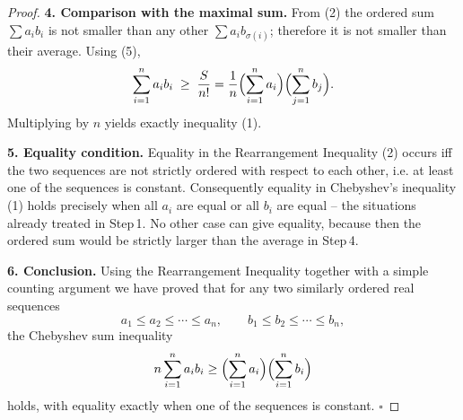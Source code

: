 \begin{proof}
\medskip\noindent\textbf{4. Comparison with the maximal sum.}  
From (2) the ordered sum \(\sum a_{i}b_{i}\) is not smaller than any other
\(\sum a_{i}b_{\sigma(i)}\); therefore it is not smaller than their average.  Using (5),
\[
\sum_{i=1}^{n}a_{i}b_{i}\;\ge\;
\frac{S}{n!}
=
\frac{1}{n}\Bigl(\sum_{i=1}^{n}a_{i}\Bigr)\Bigl(\sum_{j=1}^{n}b_{j}\Bigr).
\]
Multiplying by \(n\) yields exactly inequality (1).

\medskip\noindent\textbf{5. Equality condition.}  
Equality in the Rearrangement Inequality (2) occurs iff the two sequences are
not strictly ordered with respect to each other, i.e. at least one of the
sequences is constant.  Consequently equality in Chebyshev’s inequality (1)
holds precisely when all \(a_{i}\) are equal or all \(b_{i}\) are equal – the
situations already treated in Step 1. No other case can give equality, because
then the ordered sum would be strictly larger than the average in Step 4.

\medskip\noindent\textbf{6. Conclusion.}  
Using the Rearrangement Inequality together with a simple counting argument we
have proved that for any two similarly ordered real sequences
\[
a_{1}\le a_{2}\le\cdots\le a_{n},\qquad
b_{1}\le b_{2}\le\cdots\le b_{n},
\]
the Chebyshev sum inequality
\[
n\sum_{i=1}^{n}a_{i}b_{i}\ge
\Bigl(\sum_{i=1}^{n}a_{i}\Bigr)\Bigl(\sum_{i=1}^{n}b_{i}\Bigr)
\]
holds, with equality exactly when one of the sequences is constant. \(\square\)
\end{proof}